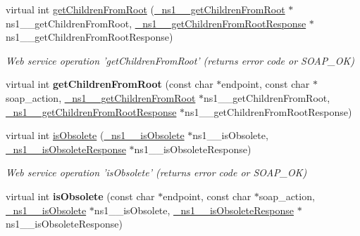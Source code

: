 \begin{DoxyCompactItemize}
\item 
\hypertarget{classOntologyQuerySoapBindingProxy_a31586b307c4a65cf48aa30d164ae7c4b}{
virtual int \hyperlink{classOntologyQuerySoapBindingProxy_a31586b307c4a65cf48aa30d164ae7c4b}{getChildrenFromRoot} (\hyperlink{class__ns1____getChildrenFromRoot}{\_\-ns1\_\-\_\-getChildrenFromRoot} $\ast$ns1\_\-\_\-getChildrenFromRoot, \hyperlink{class__ns1____getChildrenFromRootResponse}{\_\-ns1\_\-\_\-getChildrenFromRootResponse} $\ast$ns1\_\-\_\-getChildrenFromRootResponse)}
\label{classOntologyQuerySoapBindingProxy_a31586b307c4a65cf48aa30d164ae7c4b}

\begin{DoxyCompactList}\small\item\em Web service operation 'getChildrenFromRoot' (returns error code or SOAP\_\-OK) \end{DoxyCompactList}\item 
\hypertarget{classOntologyQuerySoapBindingProxy_afc07152d1f9ccf6cdaa1aadec807f580}{
virtual int {\bfseries getChildrenFromRoot} (const char $\ast$endpoint, const char $\ast$soap\_\-action, \hyperlink{class__ns1____getChildrenFromRoot}{\_\-ns1\_\-\_\-getChildrenFromRoot} $\ast$ns1\_\-\_\-getChildrenFromRoot, \hyperlink{class__ns1____getChildrenFromRootResponse}{\_\-ns1\_\-\_\-getChildrenFromRootResponse} $\ast$ns1\_\-\_\-getChildrenFromRootResponse)}
\label{classOntologyQuerySoapBindingProxy_afc07152d1f9ccf6cdaa1aadec807f580}

\item 
\hypertarget{classOntologyQuerySoapBindingProxy_a08f61f9d07d4246605980c42b1492f9e}{
virtual int \hyperlink{classOntologyQuerySoapBindingProxy_a08f61f9d07d4246605980c42b1492f9e}{isObsolete} (\hyperlink{class__ns1____isObsolete}{\_\-ns1\_\-\_\-isObsolete} $\ast$ns1\_\-\_\-isObsolete, \hyperlink{class__ns1____isObsoleteResponse}{\_\-ns1\_\-\_\-isObsoleteResponse} $\ast$ns1\_\-\_\-isObsoleteResponse)}
\label{classOntologyQuerySoapBindingProxy_a08f61f9d07d4246605980c42b1492f9e}

\begin{DoxyCompactList}\small\item\em Web service operation 'isObsolete' (returns error code or SOAP\_\-OK) \end{DoxyCompactList}\item 
\hypertarget{classOntologyQuerySoapBindingProxy_a7d3f65e4090b3b3cdd602357234d28ad}{
virtual int {\bfseries isObsolete} (const char $\ast$endpoint, const char $\ast$soap\_\-action, \hyperlink{class__ns1____isObsolete}{\_\-ns1\_\-\_\-isObsolete} $\ast$ns1\_\-\_\-isObsolete, \hyperlink{class__ns1____isObsoleteResponse}{\_\-ns1\_\-\_\-isObsoleteResponse} $\ast$ns1\_\-\_\-isObsoleteResponse)}
\label{classOntologyQuerySoapBindingProxy_a7d3f65e4090b3b3cdd602357234d28ad}


\end{DoxyCompactItemize}
